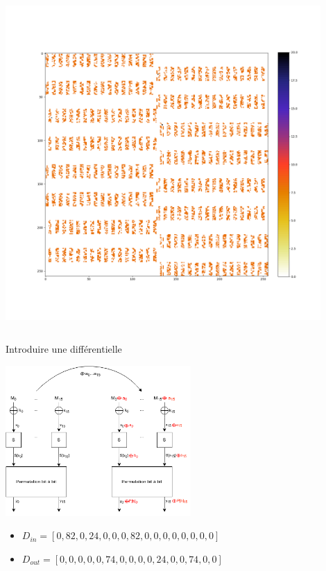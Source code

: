 \begin{frame}[fragile]
\begin{columns}[c]
\begin{center}
            \includegraphics[trim=30pt 30pt 30pt 100pt, clip, width=0.9\textwidth]{img/crypto/jafar/sbox-ddt.png}
        \end{center}
    \end{columns}

\end{frame}



\begin{frame}{Introduire une différentielle}
        \begin{center}                  
            \includegraphics[width=0.53\textwidth]{img/crypto/jafar/auto/1round.png}
        \end{center}
        \pause
    \begin{itemize}
        \item $D_{in}=[0, 82, 0, 24, 0, 0, 0, 82, 0, 0, 0, 0, 0, 0, 0, 0]$
        \item $D_{out}=[0, 0, 0, 0, 0, 74, 0, 0, 0, 0, 24, 0, 0, 74, 0, 0]$
    \end{itemize}

\end{frame}


